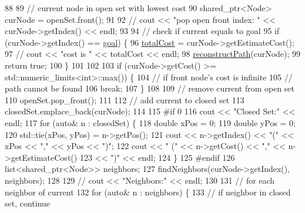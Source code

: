 \begin{DoxyCode}
88 
89         \textcolor{comment}{// current node in open set with lowest cost}
90         shared\_ptr<Node> curNode = openSet.front();
91 
92         \textcolor{comment}{// cout << "pop open front index: " << curNode->getIndex() << endl;}
93 
94         \textcolor{comment}{// check if current equals to goal}
95         \textcolor{keywordflow}{if} (curNode->getIndex() == \hyperlink{classPathFindingAlgorithm_ae8acf41f92ba72a969a44640c99fb8a4}{goal}) \{
96             \hyperlink{classPathFindingAlgorithm_ad6a91f82618d6a7a95900b5c63337837}{totalCost} = curNode->getEstimateCost();
97             \textcolor{comment}{// cout << "cost is " << totalCost << endl;}
98             \hyperlink{classPathFindingAlgorithm_abea0e189da3910ad823fb64d69e76b71}{reconstructPath}(curNode);
99             \textcolor{keywordflow}{return} \textcolor{keyword}{true};
100         \}
101 
102 
103         \textcolor{keywordflow}{if} (curNode->getCost() >= std::numeric\_limits<int>::max()) \{
104             \textcolor{comment}{// if front node's cost is infinite}
105             \textcolor{comment}{// path cannot be found}
106             \textcolor{keywordflow}{break};
107         \}
108 
109         \textcolor{comment}{// remove current from open set}
110         openSet.pop\_front();
111 
112         \textcolor{comment}{// add current to closed set}
113         closedSet.emplace\_back(curNode);
114 
115 \textcolor{preprocessor}{#if 0}
116 \textcolor{preprocessor}{}        cout << \textcolor{stringliteral}{"Closed Set:"} << endl;
117         \textcolor{keywordflow}{for} (\textcolor{keyword}{auto}& n : closedSet) \{
118             \textcolor{keywordtype}{double} xPos = 0;
119             \textcolor{keywordtype}{double} yPos = 0;
120             std::tie(xPos, yPos) = n->getPos();
121             cout << n->getIndex() << \textcolor{stringliteral}{"("} << xPos << \textcolor{stringliteral}{","} << yPos << \textcolor{stringliteral}{")"};
122             cout << \textcolor{stringliteral}{" ("} << n->getCost() << \textcolor{stringliteral}{","} << n->getEstimateCost()
123                  << \textcolor{stringliteral}{")"} << endl;
124         \}
125 \textcolor{preprocessor}{#endif}
126 \textcolor{preprocessor}{}        list<shared\_ptr<Node>> neighbors;
127         findNeighbors(curNode->getIndex(), neighbors);
128 
129         \textcolor{comment}{// cout << "Neighbors:" << endl;}
130 
131         \textcolor{comment}{// for each neighbor of current}
132         \textcolor{keywordflow}{for} (\textcolor{keyword}{auto}& n : neighbors) \{
133             \textcolor{comment}{// if neighbor in closed set, continue}

\end{DoxyCode}
